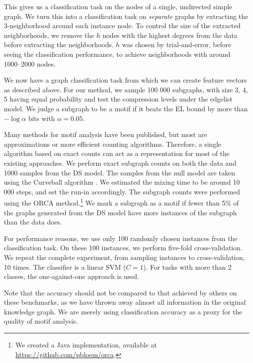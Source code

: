 \documentclass[twoside,11pt]{article}
\begin{document}
This gives us a classification task on the nodes of a single, undirected simple graph. We turn this into a classification task on \emph{separate} graphs by extracting the 3-neighborhood around each instance node. To control the size of the extracted neighborhoods, we remove the $h$ nodes with the highest degrees from the data before extracting the neighborhoods. $h$ was chosen by trial-and-error, before seeing the classification performance, to achieve neighborhoods with around 1000--2000 nodes.

We now have a graph classification task from which we can create feature vectors as described above. For our method, we sample 100 000 subgraphs, with size 3, 4, 5 having equal probability and test the compression levels under the edgelist model. We judge a subgraph to be a motif if it beats the EL bound by more than $- \log \alpha$ bits with $\alpha = 0.05$. 

Many methods for motif analysis have been published, but most are approximations or more efficient counting algorithms. Therefore, a single algorithm based on exact counts can act as a representation for most of the existing approaches. We perform exact subgraph counts on both the data and 1000 samples from the DS model. The samples from the null model are taken using the Curveball algorithm \citep{strona2014fast,carstens2016curveball}. We estimated the mixing time to be around 10 000 steps, and set the run-in accordingly. The subgraph counts were performed using the ORCA method.\footnote{We created a Java implementation, available at \url{https://github.com/pbloem/orca}.} We mark a subgraph as a motif if fewer than 5\% of the graphs generated from the DS model have more instances of the subgraph than the data does.\footnotemark~


For performance reasons, we use only 100 randomly chosen instances from the classification task. On these 100 instances, we perform five-fold cross-validation.
We repeat the complete experiment, from sampling instances to cross-validation, 10 times. The classifier is a linear SVM ($C=1$). For tasks with more than 2 classes, the one-against-one approach \citep{knerr1990single} is used.

Note that the accuracy should not be compared to that achieved by others on these benchmarks, as we have thrown away almost all information in the original knowledge graph. We are merely using classification accuracy as a proxy for the quality of motif analysis. 
\end{document}
